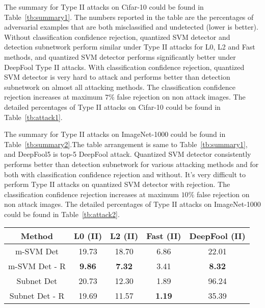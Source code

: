 \documentclass[10pt,twocolumn,letterpaper]{article}
\begin{document}
The summary for Type II attacks on Cifar-10 could be found in Table~\ref{tb:summary1}. The numbers reported in the table are the percentages of adversarial examples that
are both misclassified and undetected (lower is better). Without classification confidence rejection, quantized SVM detector and detection subnetwork perform similar under
Type II attacks for L0, L2 and Fast methods, and quantized SVM detector performs significantly better under DeepFool Type II attacks. With classification confidence rejection,
quantized SVM detector is very hard to attack and performs better than detection subnetwork on almost all attacking methods. The classification confidence rejection increases at maximum
 $7\%$ false rejection on non attack images. The detailed percentages of Type II attacks on Cifar-10 could be found in Table~\ref{tb:attack1}. 

The summary for Type II attacks on ImageNet-1000 could be found in Table~\ref{tb:summary2}.The table arrangement is same to Table~\ref{tb:summary1}, and DeepFool5
is top-5 DeepFool attack. Quantized SVM detector consistently performs better than detection subnetwork for various attacking methods and for both with classification confidence
rejection and without. It's very difficult to perform Type II attacks on quantized SVM detector with rejection.  The classification confidence rejection increases at maximum $10\%$
false rejection on non attack images.  The detailed percentages of Type II attacks
on ImageNet-1000 could be found in Table~\ref{tb:attack2}. 

\begin{table*}[h!]
\begin{center}
\resizebox{0.53\textwidth}{!}
{
\begin{tabular}{  c | c | c | c | c }
Method & L0 (II) & L2 (II) & Fast (II) & DeepFool (II) \\
\hline
m-SVM Det & 19.73 & 18.70 & 6.86 & 22.01 \\
m-SVM Det - R & \textbf{9.86} & \textbf{7.32} & 3.41 & \textbf{8.32} \\
Subnet Det & 20.73 & 12.30 & 1.89 & 96.24 \\
Subnet Det - R & 19.69 & 11.57 & \textbf{1.19} & 35.39 \\
\end{tabular}
}
\caption{Percentages of CIFAR-10 Type II attack adversarial examples that are both misclassified and undetected, lower is better. - R means classification confidence rejection is used (rejection ratio is 0.25), otherwise only the detector is on duty. Without classification confidence rejection, quantized SVM detector and detection subnetwork perform similar under
Type II attacks for L0, L2 and Fast methods, and quantized SVM detector performs significantly better under DeepFool Type II attacks. With classification confidence rejection,
quantized SVM detector is hard to attack and performs better than detection subnetwork on almost all attacking methods. }
\label{tb:summary1}
\end{center}
\end{table*}
\end{document}
